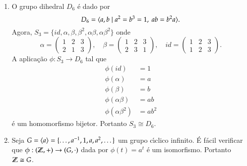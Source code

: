 \begin{exemplos}
	\begin{enumerate}
		\item O grupo dihedral $D_6$ \'e dado por
		\[
			D_6 = \langle{a,b \mid a^2 = b^3 = 1,\ ab = b^2a}\rangle.
		\]
		Agora, $S_3 = \{id,\alpha,\beta,\beta^2,\alpha\beta,\alpha\beta^2\}$ onde
		\[
			\alpha = \begin{pmatrix}
				1 & 2 & 3\\
				2 & 1 & 3
			\end{pmatrix},\quad
			\beta = \begin{pmatrix}
				1 & 2 & 3\\
				2 & 3 & 1
			\end{pmatrix},\quad
			id = \begin{pmatrix}
				1 & 2 & 3\\
				1 & 2 & 3
			\end{pmatrix}.
		\]
		A aplica\c{c}\~ao $\phi : S_3 \to D_6$ tal que
		\begin{align*}
			\phi(id) &= 1\\
			\phi(\alpha) &= a\\
			\phi(\beta) &= b\\
			\phi(\alpha\beta) &= ab\\
			\phi(\alpha\beta^2) &= ab^2
		\end{align*}
		\'e um homomorfismo bijetor. Portanto $S_3 \cong D_6$.
		\item Seja $G = \langle{a}\rangle = \{\dots, a^{-1}, 1, a, a^2, \dots\}$ um grupo c{\'\i}clico infinito. \'E f\'acil verificar que $\phi: (\mathbb{Z}, +) \to (G, \cdot)$ dada por $\phi(t) = a^t$ \'e um isomorfismo. Portanto $\mathbb{Z} \cong G$.
	\end{enumerate}
\end{exemplos}

